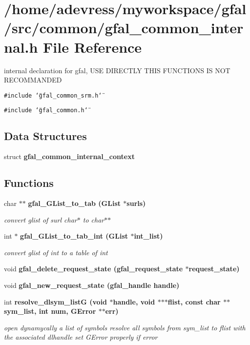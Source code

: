 \section{/home/adevress/myworkspace/gfal/src/common/gfal\_\-common\_\-internal.h File Reference}
\label{gfal__common__internal_8h}
internal declaration for gfal, USE DIRECTLY THIS FUNCTIONS IS NOT RECOMMANDED 

{\tt \#include \char`\"{}gfal\_\-common\_\-srm.h\char`\"{}}\par
{\tt \#include \char`\"{}gfal\_\-common.h\char`\"{}}\par
\subsection*{Data Structures}
\begin{CompactItemize}
\item 
struct \textbf{gfal\_\-common\_\-internal\_\-context}
\end{CompactItemize}
\subsection*{Functions}
\begin{CompactItemize}
\item 
char $\ast$$\ast$ \bf{gfal\_\-GList\_\-to\_\-tab} (GList $\ast$surls)
\begin{CompactList}\small\item\em convert glist of surl char$\ast$ to char$\ast$$\ast$ \item\end{CompactList}\item 
int $\ast$ \bf{gfal\_\-GList\_\-to\_\-tab\_\-int} (GList $\ast$int\_\-list)
\begin{CompactList}\small\item\em convert glist of int to a table of int \item\end{CompactList}\item 
void \bf{gfal\_\-delete\_\-request\_\-state} (\bf{gfal\_\-request\_\-state} $\ast$request\_\-state)
\item 
void \bf{gfal\_\-new\_\-request\_\-state} (gfal\_\-handle handle)
\item 
int \bf{resolve\_\-dlsym\_\-list\-G} (void $\ast$handle, void $\ast$$\ast$$\ast$flist, const char $\ast$$\ast$sym\_\-list, int num, GError $\ast$$\ast$err)\label{gfal__common__internal_8h_0323a4ab58106e316851c1ae06148e28}

\begin{CompactList}\small\item\em open dynamycally a list of symbols resolve all symbols from sym\_\-list to flist with the associated dlhandle set GError properly if error \item\end{CompactList}\end{CompactItemize}


